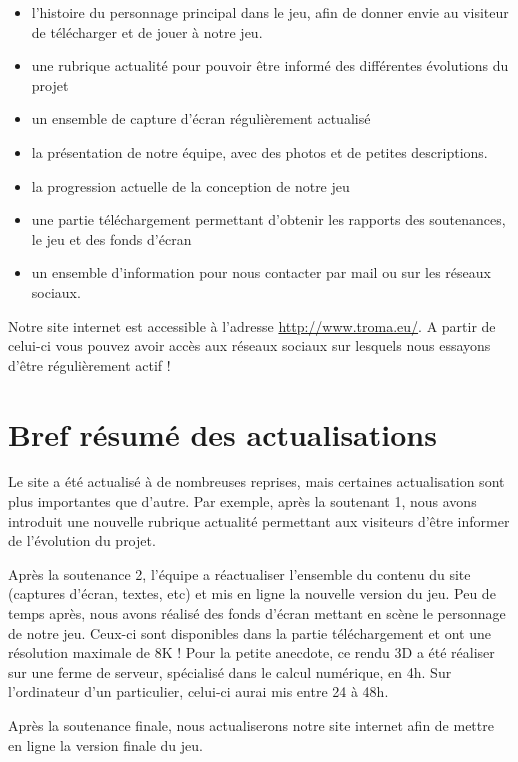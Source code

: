 \documentclass[11pt]{report}
\begin{document}
\begin{itemize}
  \item l’histoire du personnage principal dans le jeu, afin de donner envie au visiteur de télécharger et de jouer à notre jeu.
  \item une rubrique actualité pour pouvoir être informé des différentes évolutions du projet
  \item un ensemble de capture d'écran régulièrement actualisé
  \item la présentation de notre équipe, avec des photos et de petites descriptions.
  \item la progression actuelle de la conception de notre jeu
  \item une partie téléchargement permettant d'obtenir les rapports des soutenances, le jeu et des fonds d'écran
  \item un ensemble d'information pour nous contacter par mail ou sur les réseaux sociaux.
\end{itemize}

Notre site internet est accessible à l'adresse \url{http://www.troma.eu/}. A partir de celui-ci vous pouvez avoir accès aux réseaux sociaux sur lesquels nous essayons d'être régulièrement actif !

\section{Bref résumé des actualisations}

Le site a été actualisé à de nombreuses reprises, mais certaines actualisation sont plus importantes que d'autre. Par exemple, après la soutenant 1, nous avons introduit une nouvelle rubrique actualité permettant aux visiteurs d'être informer de l'évolution du projet.

Après la soutenance 2, l'équipe a réactualiser l'ensemble du contenu du site (captures d'écran, textes, etc) et mis en ligne la nouvelle version du jeu. Peu de temps après, nous avons réalisé des fonds d'écran mettant en scène le personnage de notre jeu. Ceux-ci sont disponibles dans la partie téléchargement et ont une résolution maximale de 8K ! Pour la petite anecdote, ce rendu 3D a été réaliser sur une ferme de serveur, spécialisé dans le calcul numérique, en 4h. Sur l'ordinateur d'un particulier, celui-ci aurai mis entre 24 à 48h.

Après la soutenance finale, nous actualiserons notre site internet afin de mettre en ligne la version finale du jeu.
\end{document}
